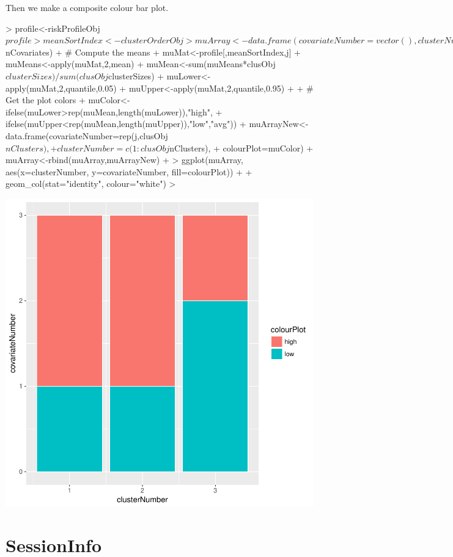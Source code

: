 \documentclass{article}
\begin{document}
Then we make a composite colour bar plot. 
\begin{Schunk}
\begin{Sinput}
> profile<-riskProfileObj$profile
> meanSortIndex<-clusterOrderObj
> muArray<-data.frame(covariateNumber=vector(),clusterNumber=vector(),colourPlot=vector())
> for(j in 1:runInfoObj$nCovariates){
+   # Compute the means
+   muMat<-profile[,meanSortIndex,j]
+   muMeans<-apply(muMat,2,mean)
+   muMean<-sum(muMeans*clusObj$clusterSizes)/sum(clusObj$clusterSizes)
+   muLower<-apply(muMat,2,quantile,0.05)
+   muUpper<-apply(muMat,2,quantile,0.95)
+ 
+     # Get the plot colors
+   muColor<-ifelse(muLower>rep(muMean,length(muLower)),"high",
+                 ifelse(muUpper<rep(muMean,length(muUpper)),"low","avg"))
+   muArrayNew<-data.frame(covariateNumber=rep(j,clusObj$nClusters),
+                          clusterNumber=c(1:clusObj$nClusters),
+                          colourPlot=muColor)
+   muArray<-rbind(muArray,muArrayNew)  
+ }
> ggplot(muArray, aes(x=clusterNumber, y=covariateNumber, fill=colourPlot)) +
+   geom_col(stat="identity", colour="white") 
> 
\end{Sinput}
\end{Schunk}
\includegraphics{Fig-test1}
\section{SessionInfo}
\end{document}
